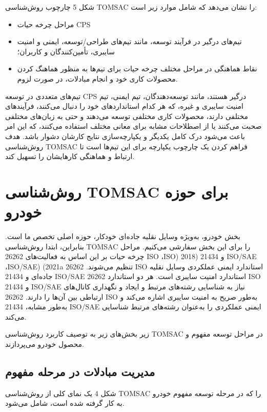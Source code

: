 \documentclass[a4paper,10pt]{article}
\begin{document}
        شکل 5 چارچوب روش‌شناسی TOMSAC را نشان می‌دهد که شامل موارد زیر است:
    
        \begin{itemize}
            
            \item مراحل چرخه حیات CPS

            \item تیم‌های درگیر در فرآیند توسعه، مانند تیم‌های طراحی/توسعه، ایمنی و امنیت   سایبری، تأمین‌کنندگان و کاربران؛

            \item نقاط هماهنگی در مراحل مختلف چرخه حیات برای تیم‌ها به منظور هماهنگ کردن محصولات کاری خود و انجام مبادلات، در صورت لزوم.

        \end{itemize}

        تیم‌های متعددی در توسعه CPS درگیر هستند، مانند توسعه‌دهندگان، تیم ایمنی، تیم امنیت سایبری و غیره، که هر کدام استانداردهای خود را دنبال می‌کنند، فرآیندهای مختلفی دارند، محصولات کاری مختلفی توسعه می‌دهند و حتی به زبان‌های مختلفی صحبت می‌کنند یا از اصطلاحات مشابه برای معانی مختلف استفاده می‌کنند، که این امر باعث می‌شود درک کامل یکدیگر و یکپارچه‌سازی نتایج کارشان دشوار باشد. هدف روش‌شناسی TOMSAC فراهم کردن یک چارچوب یکپارچه برای این تیم‌ها است تا ارتباط و هماهنگی کارهایشان را تسهیل کند.

    \section{روش‌شناسی TOMSAC برای حوزه خودرو}

        بخش خودرو، به‌ویژه وسایل نقلیه جاده‌ای خودکار، حوزه اصلی تخصص ما است. بنابراین، ابتدا روش‌شناسی TOMSAC را برای این بخش سفارشی می‌کنیم. مراحل چرخه حیات بر این اساس به فعالیت‌های 26262 ISO ،ISO) 2018) و 21434 ISO/SAE ،ISO/SAE) (2021a تنظیم می‌شوند. 26262 ISO استاندارد ایمنی عملکردی وسایل نقلیه جاده‌ای و 21434 ISO/SAE استاندارد امنیت سایبری است. هر دو استاندارد 26262 ISO و 21434 ISO/SAE نیاز به شناسایی رشته‌های مرتبط و ایجاد و نگهداری کانال‌های ارتباطی بین آن‌ها را دارند. 26262 ISO به‌طور صریح به امنیت سایبری اشاره می‌کند و به‌طور مشابه، 21434 ISO/SAE ایمنی عملکردی را به‌عنوان رشته‌های مرتبط شناسایی می‌کند.

        زیر بخش‌های زیر به توصیف کاربرد روش‌شناسی TOMSAC در مراحل توسعه مفهوم و محصول خودرو می‌پردازند.

        \subsection{مدیریت مبادلات در مرحله مفهوم}

            شکل 4 یک نمای کلی از روش‌شناسی TOMSAC را که در مرحله توسعه مفهوم خودرو به کار گرفته شده است، شامل می‌شود.

            
        
\end{document}
